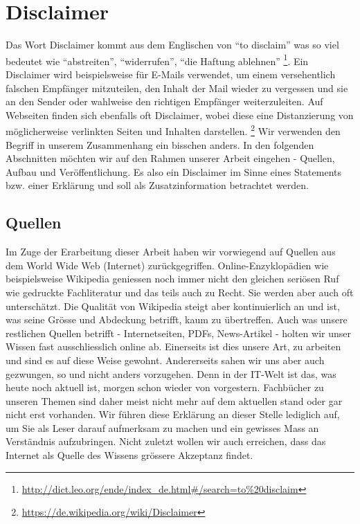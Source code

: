 \section{Disclaimer}
Das Wort Disclaimer kommt aus dem Englischen von ``to disclaim'' was so viel bedeutet wie ``abstreiten'', ``widerrufen'', ``die Haftung ablehnen''
\footnote{\url{http://dict.leo.org/ende/index_de.html\#/search=to\%20disclaim}}.
Ein Disclaimer wird beispielsweise für E-Mails verwendet, um einem versehentlich falschen Empfänger mitzuteilen, den Inhalt der Mail wieder zu vergessen und sie an den Sender oder wahlweise den richtigen Empfänger weiterzuleiten. Auf Webseiten finden sich ebenfalls oft Disclaimer, wobei diese eine Distanzierung von möglicherweise verlinkten Seiten und Inhalten darstellen.
\footnote{\url{https://de.wikipedia.org/wiki/Disclaimer}}
Wir verwenden den Begriff in unserem Zusammenhang ein bisschen anders. In den folgenden Abschnitten möchten wir auf den Rahmen unserer Arbeit eingehen - Quellen, Aufbau und Veröffentlichung. Es also ein Disclaimer im Sinne eines Statements bzw. einer Erklärung und soll als Zusatzinformation betrachtet werden.

\subsection{Quellen}
Im Zuge der Erarbeitung dieser Arbeit haben wir vorwiegend auf Quellen aus dem World Wide Web (Internet) zurückgegriffen. Online-Enzyklopädien wie beispielsweise Wikipedia geniessen noch immer nicht den gleichen seriösen Ruf wie gedruckte Fachliteratur und das teils auch zu Recht. Sie werden aber auch oft unterschätzt. Die Qualität von Wikipedia steigt aber kontinuierlich an und ist, was seine Grösse und Abdeckung betrifft, kaum zu übertreffen. Auch was unsere restlichen Quellen betrifft - Internetseiten, PDFs, News-Artikel - holten wir unser Wissen fast ausschliesslich online ab. Einerseits ist dies unsere Art, zu arbeiten und sind es auf diese Weise gewohnt. Andererseits sahen wir uns aber auch gezwungen, so und nicht anders vorzugehen. Denn in der IT-Welt ist das, was heute noch aktuell ist, morgen schon wieder von vorgestern. Fachbücher zu unseren Themen sind daher meist nicht mehr auf dem aktuellen stand oder gar nicht erst vorhanden. Wir führen diese Erklärung an dieser Stelle lediglich auf, um Sie als Leser darauf aufmerksam zu machen und ein gewisses Mass an Verständnis aufzubringen. Nicht zuletzt wollen wir auch erreichen, dass das Internet als Quelle des Wissens grössere Akzeptanz findet.


